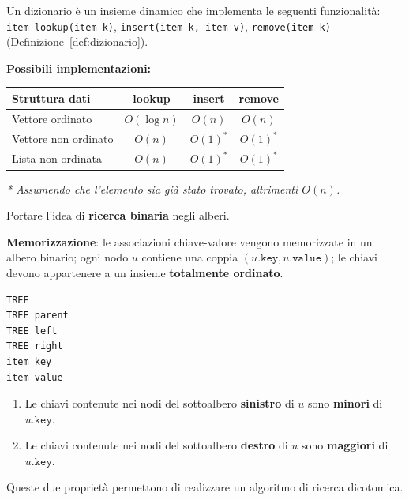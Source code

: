 \documentclass[12pt, a4paper]{article}
\begin{document}
\begin{tcolorbox}[colback=lightergray!10, colframe=tocsec, title=\textbf{Dizionario (richiamo)}]
Un dizionario è un insieme dinamico che implementa le seguenti funzionalità: \texttt{item lookup(item k)}, \texttt{insert(item k, item v)}, \texttt{remove(item k)} (Definizione~\ref{def:dizionario}).
\end{tcolorbox}

\textbf{Possibili implementazioni:}
\begin{center}
\begin{tabular}{lccc}
\toprule
\textbf{Struttura dati} & \textbf{lookup} & \textbf{insert} & \textbf{remove} \\
\midrule
Vettore ordinato & $O(\log n)$ & $O(n)$ & $O(n)$ \\
Vettore non ordinato & $O(n)$ & $O(1)^*$ & $O(1)^*$ \\
Lista non ordinata & $O(n)$ & $O(1)^*$ & $O(1)^*$ \\
\bottomrule
\end{tabular}
\end{center}
\textit{* Assumendo che l'elemento sia già stato trovato, altrimenti $O(n)$.}

\begin{tcolorbox}[colback=lightergray!10, colframe=tocsec, title=\textbf{Idea Ispiratrice}]
Portare l'idea di \textbf{ricerca binaria} negli alberi.
\end{tcolorbox}

\textbf{Memorizzazione}: le associazioni chiave-valore vengono memorizzate in un albero binario; ogni nodo $u$ contiene una coppia $(u.\texttt{key}, u.\texttt{value})$; le chiavi devono appartenere a un insieme \textbf{totalmente ordinato}.
\begin{verbatim}
TREE
TREE parent
TREE left
TREE right
item key
item value
\end{verbatim}

\begin{tcolorbox}[colback=lightergray!10, colframe=tocsec, title=\textbf{Proprietà dell'ABR}]
\label{prop:proprieta-abr}
\begin{enumerate}
    \item Le chiavi contenute nei nodi del sottoalbero \textbf{sinistro} di $u$ sono \textbf{minori} di $u.\texttt{key}$.
    \item Le chiavi contenute nei nodi del sottoalbero \textbf{destro} di $u$ sono \textbf{maggiori} di $u.\texttt{key}$.
\end{enumerate}
Queste due proprietà permettono di realizzare un algoritmo di ricerca dicotomica.
\end{tcolorbox}
\end{document}
